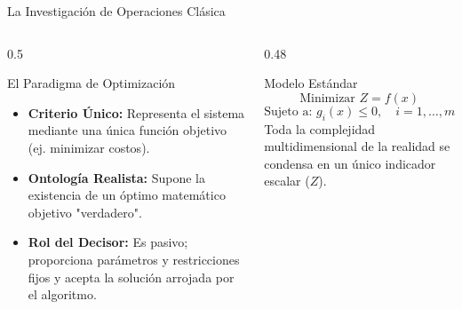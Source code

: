 \documentclass[aspectratio=169, 10pt]{beamer}
\begin{document}
\begin{frame}{La Investigación de Operaciones Clásica}
    \begin{columns}
        \begin{column}{0.5\textwidth}
            \begin{block}{El Paradigma de Optimización}
                \begin{itemize}
                    \item \textbf{Criterio Único:} Representa el sistema mediante una única función objetivo (ej. minimizar costos).
                    \item \textbf{Ontología Realista:} Supone la existencia de un óptimo matemático objetivo "verdadero".
                    \item \textbf{Rol del Decisor:} Es pasivo; proporciona parámetros y restricciones fijos y acepta la solución arrojada por el algoritmo.
                \end{itemize}
            \end{block}
        \end{column}
        
        \begin{column}{0.48\textwidth}
            \begin{exampleblock}{Modelo Estándar}
                \begin{equation*}
                    \text{Minimizar } Z = f(x)
                \end{equation*}
                \begin{equation*}
                    \text{Sujeto a: } g_i(x) \le 0, \quad i = 1, \dots, m
                \end{equation*}
                \vskip 5pt
                Toda la complejidad multidimensional de la realidad se condensa en un único indicador escalar ($Z$).
            \end{exampleblock}
        \end{column}
    \end{columns}
\end{frame}
\end{document}
